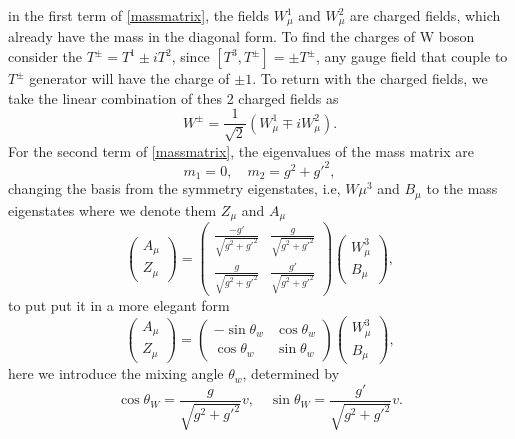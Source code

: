 \documentclass{report}
\numberwithin{equation}{section}
\begin{document}
in the first term of \eqref{massmatrix}, the fields $W_\mu^1$ and $W_\mu^2$ are charged fields, which already have the mass in the diagonal form. To find the charges of W boson consider the $T^\pm= T^1\pm i T^2$, since $[T^3,T^\pm]= \pm T^\pm$, any gauge field that couple to $T^\pm$ generator will have the charge of $\pm 1$. To return with the charged fields, we take the linear combination of thes 2 charged fields as
\begin{equation}
W^{\pm}= \frac{1}{\sqrt{2}}(W_\mu^1\mp  iW_\mu^2).
\end{equation}
For the second term of \eqref{massmatrix}, the eigenvalues of the mass matrix are 
\begin{equation}
m_1=0, \quad m_2=g^2+g'^2,
\end{equation}
changing the basis from the symmetry eigenstates, i.e, $W\mu^3$ and $B_\mu$ to the mass eigenstates where we denote them $Z_\mu$ and $A_\mu$
\begin{equation}
\begin{pmatrix}
A_\mu \\Z_\mu
\end{pmatrix}=\begin{pmatrix}
\frac{-g'}{\sqrt{g^2+g'^2}}& \frac{g}{\sqrt{g^2+g'^2}}\\
\frac{g}{\sqrt{g^2+g'^2}}&\frac{g'}{\sqrt{g^2+g'^2}}
\end{pmatrix}\begin{pmatrix}
W_\mu^3\\B_\mu
\end{pmatrix},
\end{equation}
to put put it in a more elegant form
\begin{equation}
\begin{pmatrix}
A_\mu\\
Z_\mu
\end{pmatrix}
=\begin{pmatrix}
-\sin \theta_w & \cos \theta_w \\
 \cos\theta_w & \sin\theta_w
\end{pmatrix}
\begin{pmatrix}
W_\mu^3\\
B_\mu
\end{pmatrix},\label{3}
\end{equation}
here we introduce the mixing angle $\theta_w$, determined by
\begin{equation}
\cos \theta_W=\frac{g}{\sqrt{g^2+g'^2}}v,\quad \sin \theta_W=\frac{g'}{\sqrt{g^2+g'^2}}v.
\end{equation}
\end{document}
